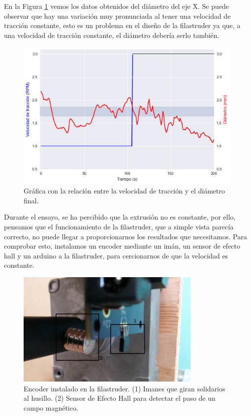 En la Figura \ref{fig:2007105-graf} vemos los datos obtenidos del diámetro del eje X. Se puede observar que hay una variación muy pronunciada al tener una velocidad de tracción constante, esto es un problema en el diseño de la filastruder ya que, a una velocidad de tracción constante, el diámetro debería serlo también.

\begin{figure}[H]
    \centering
    \includegraphics[width=0.99\textwidth]{images/producciones/20072015/output_8_0.png}
    \caption[Gráfica con la relación entre la velocidad de tracción y el diámetro final.]{Gráfica con la relación entre la velocidad de tracción y el diámetro final.}
    \label{fig:2007105-graf}
\end{figure}

 Durante el ensayo, se ha percibido que la extrusión no es constante, por ello, pensamos que el funcionamiento de la filastruder, que a simple vista parecía correcto, no puede llegar a proporcionarnos los resultados que necesitamos. Para comprobar esto, instalamos un encoder mediante un imán, un sensor de efecto hall y un arduino a la filastruder, para cercionarnos de que la velocidad es constante.

\begin{figure}[H]
    \centering
    \includegraphics[width=0.8\textwidth]{images/producciones/20072015/IMG_20150721_110502.jpg}
    \caption[Encoder instalado en la filastruder.]{Encoder instalado en la filastruder. (1) Imanes que giran solidarios al husillo. (2) Sensor de Efecto Hall para detectar el paso de un campo magnético.}
    \label{fig:2007105-enc}
\end{figure}

